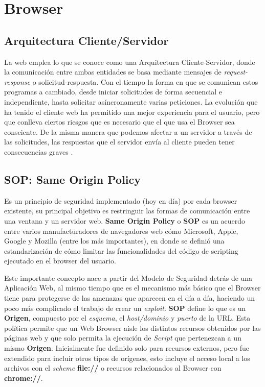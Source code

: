 \section{Browser}
\label{chap2:Browser}

    \subsection{Arquitectura Cliente/Servidor}
    \label{chap2:ArqCS}
    La web emplea lo que se conoce como una Arquitectura Cliente-Servidor, donde la comunicación entre ambas entidades se basa mediante mensajes de \textit{request-response} o solicitud-respuesta. Con el tiempo la forma en que se comunican estos programas a cambiado, desde iniciar solicitudes de forma secuencial e independiente, hasta solicitar asíncronamente varias peticiones. La evolución que ha tenido el cliente web ha permitido una mejor experiencia para el usuario, pero que conlleva ciertos riesgos que es necesario que el que usa el Browser sea consciente. De la misma manera que podemos afectar a un servidor a través de las solicitudes, las respuestas que el servidor envía al cliente pueden tener consecuencias graves \cite{alcorn2014browser}.


    \subsection{SOP: Same Origin Policy} %
    \label{chap2:SOP}

    Es un principio de seguridad implementado (hoy en día) por cada browser existente, su principal objetivo es restringuir las formas de comunicación entre una ventana y un servidor web. \textbf{Same Origin Policy} o \textbf{SOP} es un acuerdo entre varios manufacturadores de navegadores web cómo Microsoft, Apple, Google y Mozilla (entre los más importantes), en donde se definió una estandarización de cómo limitar las funcionalidades del código de scripting ejecutado en el browser del usuario. 

    Este importante concepto nace a partir del Modelo de Seguridad detrás de una Aplicación Web, al mismo tiempo que es el mecanismo más básico que el Browser tiene para protegerse de las amenazas que aparecen en el día a día, haciendo un poco más complicado el trabajo de crear un \textit{exploit}. \textbf{SOP} define lo que es un \textbf{Origen}, compuesto por el \textit{esquema}, el \textit{host/dominio} y \textit{puerto} de la URL. Esta política permite que un Web Browser aisle los distintos recursos obtenidos por las páginas web y que solo permita la ejecución de \textit{Script} que pertenezcan a un mismo \textbf{Origen}. Inicialmente fue definido solo para recursos externos, pero fue extendido para incluir otros tipos de orígenes, esto incluye el acceso local a los archivos con el \textit{scheme} \textbf{file://} o recursos relacionados al Browser con \textbf{chrome://}.

